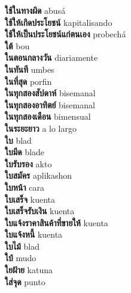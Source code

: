 \textbf{ ใช้ในทางผิด  } abusá \\
\textbf{ ใช้ให้เกิดประโยชน์  } kapitalisando \\
\textbf{ ใช้ให้เป็นประโยชน์แก่ตนเอง  } probechá \\
\textbf{ ใต้  } bou \\
\textbf{ ในตอนกลางวัน  } diariamente \\
\textbf{ ในทันที  } umbes \\
\textbf{ ในที่สุด  } porfin \\
\textbf{ ในทุกสองสัปดาห์  } bisemanal \\
\textbf{ ในทุกสองอาทิตย์  } bisemanal \\
\textbf{ ในทุกสองเดือน  } bimensual \\
\textbf{ ในระยะยาว  } a lo largo \\
\textbf{ ใบ  } blad \\
\textbf{ ใบมีด  } blade \\
\textbf{ ใบรับรอง  } akto \\
\textbf{ ใบสมัคร  } aplikashon \\
\textbf{ ใบหน้า  } cara \\
\textbf{ ใบเสร็จ  } kuenta \\
\textbf{ ใบเสร็จรับเงิน  } kuenta \\
\textbf{ ใบแจ้งราคาสินค้าที่ขายให้  } kuenta \\
\textbf{ ใบแจ้งหนี้  } kuenta \\
\textbf{ ใบไม้  } blad \\
\textbf{ ใบ้  } mudo \\
\textbf{ ใยฝ้าย  } katuna \\
\textbf{ ใส่จุด  } punto \\
